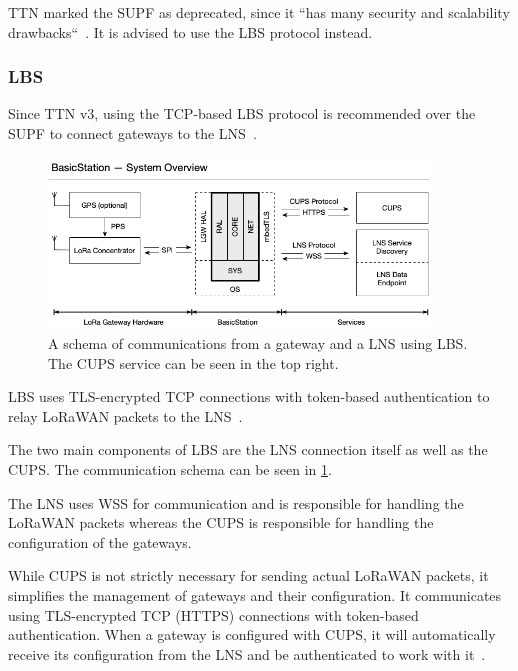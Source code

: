 \ac{TTN} marked the \acl{SUPF} as deprecated, since it ``has many security and scalability drawbacks``~\cite{the_things_industries_bv_semtech_2022}.
It is advised to use the \acl{LBS} protocol instead.

\subsubsection{\acf{LBS}}

Since \ac{TTN} v3, using the \ac{TCP}-based \acl{LBS} protocol is recommended over the \ac{SUPF} to connect gateways to the \ac{LNS}~\cite{the_things_industries_bv_semtech_2022}.

\begin{figure}[htbp]
    \centering
    \includegraphics[width=0.9\textwidth]{pictures/lorawan-structure/lora-basics-station-structure.png}
    \caption{
        A schema of communications from a gateway and a \ac{LNS} using \acf{LBS}.
        The \ac{CUPS} service can be seen in the top right.~\protect\cite{semtech_lora_developer_portal_lora_2022}
    }\label{pic:lora-basics-station-schema}
\end{figure}

\ac{LBS} uses \ac{TLS}-encrypted \ac{TCP} connections with token-based authentication to relay \ac{LoRaWAN} packets to the \ac{LNS}~\cite{the_things_industries_bv_lora_2022}.

The two main components of \acl{LBS} are the \ac{LNS} connection itself as well as the \acf{CUPS}.
The communication schema can be seen in \cref{pic:lora-basics-station-schema}.

The \ac{LNS} uses \ac{WSS} for communication and is responsible for handling the \ac{LoRaWAN} packets whereas the \acl{CUPS} is responsible for handling the configuration of the gateways.

While \ac{CUPS} is not strictly necessary for sending actual \ac{LoRaWAN} packets, it simplifies the management of gateways and their configuration.
It communicates using \ac{TLS}-encrypted \ac{TCP} (\ac{HTTPS}) connections with token-based authentication.
When a gateway is configured with \ac{CUPS}, it will automatically receive its configuration from the \ac{LNS} and be authenticated to work with it~\cite{the_things_industries_bv_lora_2022}.

